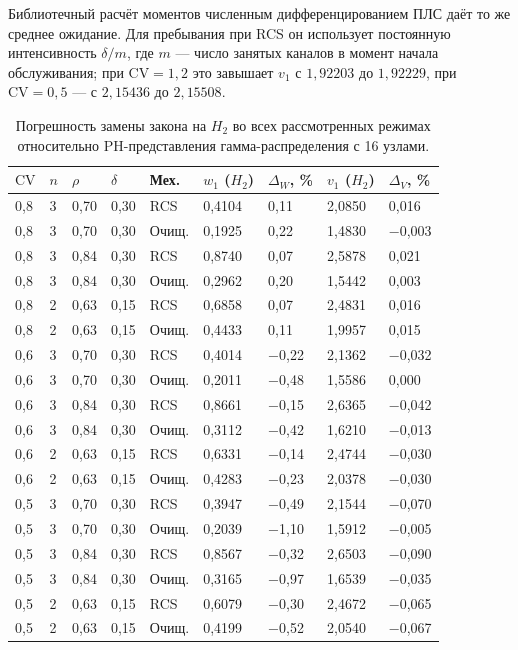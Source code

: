 \documentclass[a4paper,12pt]{article}
\begin{document}
Библиотечный расчёт моментов численным дифференцированием ПЛС даёт то же среднее ожидание. Для пребывания при RCS он использует постоянную интенсивность \(\delta/m\), где \(m\) --- число занятых каналов в момент начала обслуживания; при \(\mathrm{CV}=1{,}2\) это завышает \(v_1\) с \(1{,}92203\) до \(1{,}92229\), при \(\mathrm{CV}=0{,}5\) --- с \(2{,}15436\) до \(2{,}15508\).

\begin{table}[!htbp]
\centering\small\setlength{\tabcolsep}{2pt}
\begin{tabular}{@{}p{1.0cm}p{0.8cm}p{1.2cm}p{1.2cm}p{1.5cm}p{2.0cm}p{2.0cm}p{2.0cm}p{2.0cm}@{}}
\toprule
$\mathrm{CV}$ & $n$ & $\rho$ & $\delta$ & Мех. & $w_1$ ($H_2$) & $\Delta_W$, \% & $v_1$ ($H_2$) & $\Delta_V$, \% \\
\midrule
0,8 & 3 & 0,70 & 0,30 & RCS & 0,4104 & 0,11 & 2,0850 & 0,016 \\
0,8 & 3 & 0,70 & 0,30 & Очищ. & 0,1925 & 0,22 & 1,4830 & −0,003 \\
0,8 & 3 & 0,84 & 0,30 & RCS & 0,8740 & 0,07 & 2,5878 & 0,021 \\
0,8 & 3 & 0,84 & 0,30 & Очищ. & 0,2962 & 0,20 & 1,5442 & 0,003 \\
0,8 & 2 & 0,63 & 0,15 & RCS & 0,6858 & 0,07 & 2,4831 & 0,016 \\
0,8 & 2 & 0,63 & 0,15 & Очищ. & 0,4433 & 0,11 & 1,9957 & 0,015 \\
0,6 & 3 & 0,70 & 0,30 & RCS & 0,4014 & −0,22 & 2,1362 & −0,032 \\
0,6 & 3 & 0,70 & 0,30 & Очищ. & 0,2011 & −0,48 & 1,5586 & 0,000 \\
0,6 & 3 & 0,84 & 0,30 & RCS & 0,8661 & −0,15 & 2,6365 & −0,042 \\
0,6 & 3 & 0,84 & 0,30 & Очищ. & 0,3112 & −0,42 & 1,6210 & −0,013 \\
0,6 & 2 & 0,63 & 0,15 & RCS & 0,6331 & −0,14 & 2,4744 & −0,030 \\
0,6 & 2 & 0,63 & 0,15 & Очищ. & 0,4283 & −0,23 & 2,0378 & −0,030 \\
0,5 & 3 & 0,70 & 0,30 & RCS & 0,3947 & −0,49 & 2,1544 & −0,070 \\
0,5 & 3 & 0,70 & 0,30 & Очищ. & 0,2039 & −1,10 & 1,5912 & −0,005 \\
0,5 & 3 & 0,84 & 0,30 & RCS & 0,8567 & −0,32 & 2,6503 & −0,090 \\
0,5 & 3 & 0,84 & 0,30 & Очищ. & 0,3165 & −0,97 & 1,6539 & −0,035 \\
0,5 & 2 & 0,63 & 0,15 & RCS & 0,6079 & −0,30 & 2,4672 & −0,065 \\
0,5 & 2 & 0,63 & 0,15 & Очищ. & 0,4199 & −0,52 & 2,0540 & −0,067 \\
\bottomrule
\end{tabular}
\caption{Погрешность замены закона на \(H_2\) во всех рассмотренных режимах относительно PH-представления гамма-распределения с 16 узлами.}
\label{tab:lawfull}
\end{table}
\end{document}
